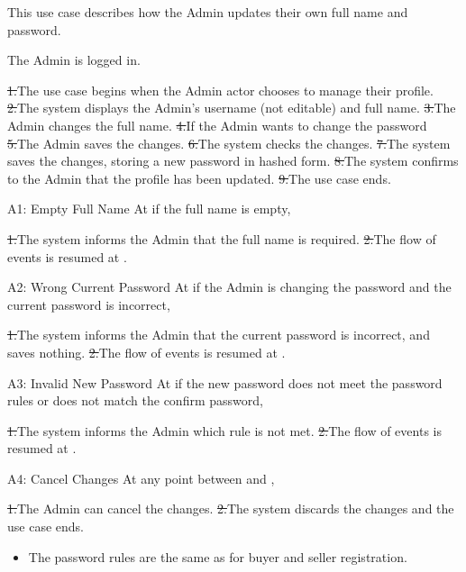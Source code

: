 This use case describes how the Admin updates their own full name and password.\par
{}
The Admin is logged in.\par
{}
\st{1.}{The use case begins when the Admin actor chooses to manage their profile.}
\st{2.}{The system displays the Admin's username (not editable) and full name.}
\st{3.}{The Admin changes the full name.}
\st{4.}{If the Admin wants to change the password}
\st{5.}{The Admin saves the changes.}
\st{6.}{The system checks the changes.}
\st{7.}{The system saves the changes, storing a new password in hashed form.}
\st{8.}{The system confirms to the Admin that the profile has been updated.}
\st{9.}{The use case ends.}
\begin{flowblock}{A1: Empty Full Name}
At  if the full name is empty,\par
\st{1.}{The system informs the Admin that the full name is required.}
\st{2.}{The flow of events is resumed at .}
\end{flowblock}
\begin{flowblock}{A2: Wrong Current Password}
At  if the Admin is changing the password and the current password is incorrect,\par
\st{1.}{The system informs the Admin that the current password is incorrect, and saves nothing.}
\st{2.}{The flow of events is resumed at .}
\end{flowblock}
\begin{flowblock}{A3: Invalid New Password}
At  if the new password does not meet the password rules or does not match the confirm password,\par
\st{1.}{The system informs the Admin which rule is not met.}
\st{2.}{The flow of events is resumed at .}
\end{flowblock}
\begin{flowblock}{A4: Cancel Changes}
At any point between  and ,\par
\st{1.}{The Admin can cancel the changes.}
\st{2.}{The system discards the changes and the use case ends.}
\end{flowblock}
\begin{itemize}
  \item The password rules are the same as for buyer and seller registration.
\end{itemize}

